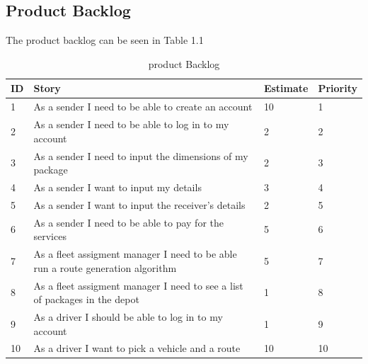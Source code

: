 \documentclass[paper=a4, fontsize=11pt]{scrartcl} %
\numberwithin{equation}{section} %
\numberwithin{figure}{section} %
\numberwithin{table}{section} %
\begin{document}
\subsection{Product Backlog}
The product backlog can be seen in Table 1.1 
\begin{table}[!hbt]
\centering
\caption{product Backlog}
\label{my-label}
\begin{tabular}{|p{1cm}|p{8cm}|p{2cm}|p{1.2cm}|}
\hline
\textbf{ID} & \textbf{Story}                                                                                         & \textbf{Estimate} & \textbf{Priority} \\ \hline
1           & As a sender I need to be able to create an account                                                     & 10                & 1                 \\ \hline
2           & As a sender I need to be able to log in to my account                                                  & 2                 & 2                 \\ \hline
3           & As a sender I need to input the dimensions of my package                                               & 2                 & 3                 \\ \hline
4           & As a sender I want to input my details                                                                 & 3                 & 4                 \\ \hline
5           & As a sender I want to input the receiver's details                                                     & 2                 & 5                 \\ \hline
6           & As a sender I need to be able to pay for the services                                                  & 5                 & 6                 \\ \hline
7           & As a fleet assigment manager I need to be able run a route generation algorithm                        & 5                 & 7                 \\ \hline
8           & As a fleet assigment manager I need to see a list of packages in the depot                             & 1                 & 8                 \\ \hline
9           & As a driver I should be able to log in to my account                                                   & 1                 & 9                 \\ \hline
10          & As a driver I want to pick a vehicle and a route                                                       & 10                & 10                \\ \hline

\end{tabular}
\end{table}
\end{document}
